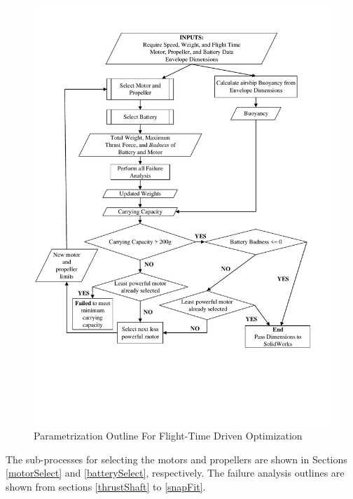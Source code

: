\documentclass[../main.tex]{subfiles}
\begin{document}
\begin{figure}[H]
	\centering
	\includegraphics[width=\linewidth]{img/paramaterization/timeBased.pdf}
	\caption{Parametrization Outline For Flight-Time Driven Optimization}
	\label{fig:timeDriven}
\end{figure}

The sub-processes for selecting the motors and propellers are shown in Sections \ref{motorSelect} and \ref{batterySelect}, respectively. The failure analysis outlines are shown from sections \ref{thrustShaft} to \ref{snapFit}.
\end{document}
